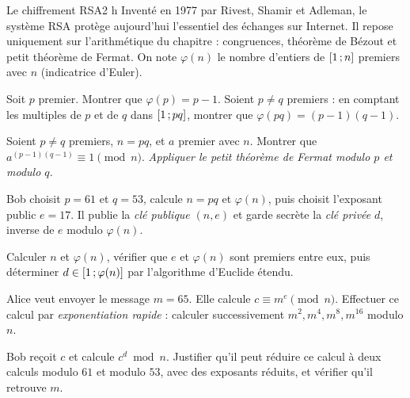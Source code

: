 

\begin{defi}{Le chiffrement RSA}{2 h}
Inventé en 1977 par Rivest, Shamir et Adleman, le système RSA protège
aujourd'hui l'essentiel des échanges sur Internet. Il repose uniquement
sur l'arithmétique du chapitre : congruences, théorème de Bézout et petit
théorème de Fermat. On note $\varphi(n)$ le nombre d'entiers de
$\mathopen{[}1\,{;}\,n\mathclose{]}$ premiers avec $n$ (indicatrice d'Euler).

\begin{questions}
  \item Soit $p$ premier. Montrer que $\varphi(p)=p-1$. Soient $p\neq q$
    premiers : en comptant les multiples de $p$ et de $q$ dans
    $\mathopen{[}1\,{;}\,pq\mathclose{]}$, montrer que $\varphi(pq)=(p-1)(q-1)$.
  \item Soient $p\neq q$ premiers, $n=pq$, et $a$ premier avec $n$.
    Montrer que $a^{(p-1)(q-1)}\equiv1\pmod n$. \emph{Appliquer le petit
    théorème de Fermat modulo $p$ et modulo $q$.}
\end{questions}

Bob choisit $p=61$ et $q=53$, calcule $n=pq$ et $\varphi(n)$, puis choisit
l'exposant public $e=17$. Il publie la \emph{clé publique} $(n,e)$ et garde
secrète la \emph{clé privée} $d$, inverse de $e$ modulo $\varphi(n)$.
\begin{questions}[resume]
  \item Calculer $n$ et $\varphi(n)$, vérifier que $e$ et $\varphi(n)$ sont
    premiers entre eux, puis déterminer $d\in\mathopen{[}1\,{;}\,\varphi(n)\mathclose{]}$ par
    l'algorithme d'Euclide étendu.
  \item Alice veut envoyer le message $m=65$. Elle calcule
    $c\equiv m^{e}\pmod n$. Effectuer ce calcul par \emph{exponentiation
    rapide} : calculer successivement $m^{2},m^{4},m^{8},m^{16}$ modulo $n$.
  \item Bob reçoit $c$ et calcule $c^{d}\bmod n$. Justifier qu'il peut
    réduire ce calcul à deux calculs modulo $61$ et modulo $53$, avec des
    exposants réduits, et vérifier qu'il retrouve $m$.
\end{questions}


\end{defi}
